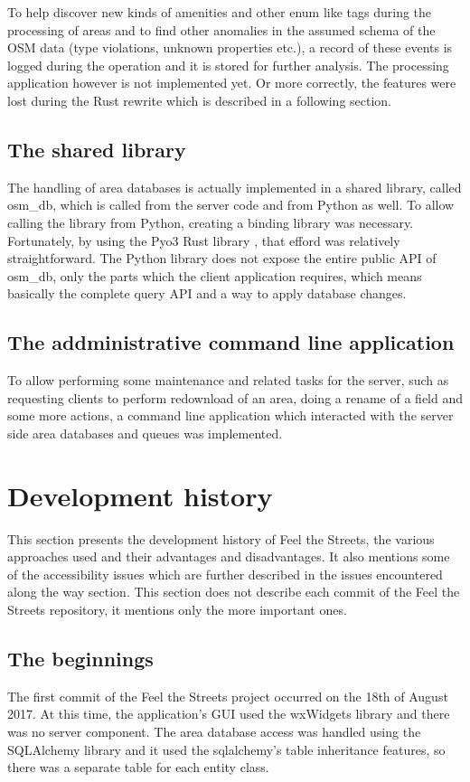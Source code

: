 \documentclass[nolof,digital]{fithesis3}
\begin{document}
To help discover new kinds of amenities and other enum like tags during the processing of areas and to find other anomalies in the assumed schema of the OSM data (type violations, unknown properties etc.), a record of these events is logged during the operation and it is stored for further analysis. The processing application however is not implemented yet. Or more correctly, the features were lost during the Rust rewrite which is described in a following section.
\subsection{The shared library}
The handling of area databases is actually implemented in a shared library, called osm\_db, which is called from the server code and from Python as well. To allow calling the library from Python, creating a binding library was necessary. Fortunately, by using the Pyo3 Rust library \parencite{pyo3}, that efford was relatively straightforward. The Python library does not expose the entire public API of osm\_db, only the parts which the client application requires, which means basically the complete query API and a way to apply database changes.
\subsection{The addministrative command line application}
To allow performing some maintenance and related tasks for the server, such as requesting clients to perform redownload of an area, doing a rename of a field and some more actions, a command line application which interacted with the server side area databases and queues was implemented.
\section{Development history}
This section presents the development history of Feel the Streets, the various approaches used and their advantages and disadvantages. It also mentions some of the accessibility issues which are further described in the issues encountered along the way section. This section does not describe each commit of the Feel the Streets repository, it mentions only the more important ones.
\subsection{The beginnings}
The first commit of the Feel the Streets project occurred on the 18th of August 2017. At this time, the application's GUI used the wxWidgets library \parencite{wx} and there was no server component. The area database access was handled using the SQLAlchemy library and it used the sqlalchemy's table inheritance features, so there was a separate table for each entity class.
\end{document}
